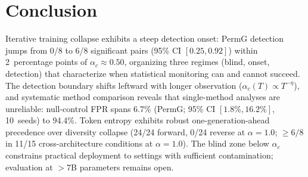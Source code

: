 \section{Conclusion}
\label{sec:conclusion}

Iterative training collapse exhibits a steep detection onset: PermG detection jumps from 0/8 to 6/8 significant pairs (95\% CI $[0.25, 0.92]$) within 2~percentage points of $\alpha_c \approx 0.50$, organizing three regimes (blind, onset, detection) that characterize when statistical monitoring can and cannot succeed.
The detection boundary shifts leftward with longer observation ($\alpha_c(T) \propto T^{-\eta}$), and systematic method comparison reveals that single-method analyses are unreliable: null-control FPR spans 6.7\% (PermG; 95\% CI $[1.8\%, 16.2\%]$, 10~seeds) to 94.4\%.
Token entropy exhibits robust one-generation-ahead precedence over diversity collapse (24/24 forward, 0/24 reverse at $\alpha{=}1.0$; ${\geq}6/8$ in 11/15 cross-architecture conditions at $\alpha{=}1.0$).
The blind zone below $\alpha_c$ constrains practical deployment to settings with sufficient contamination; evaluation at ${>}$7B parameters remains open.
